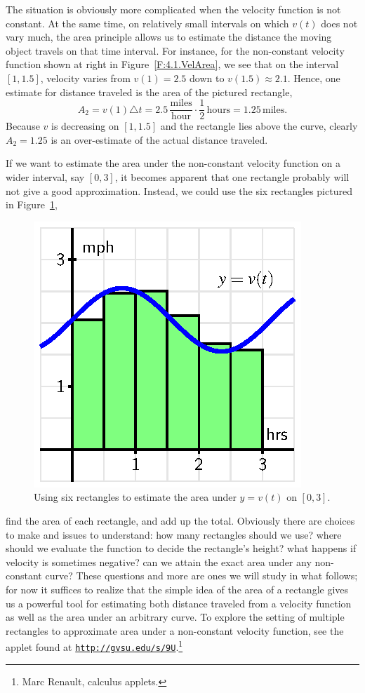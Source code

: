 The situation is obviously more complicated when the velocity function is not constant.  At the same time, on relatively small intervals on which $v(t)$ does not vary much, the area principle allows us to estimate the distance the moving object travels on that time interval.  For instance, for the non-constant velocity function shown at right in Figure~\ref{F:4.1.VelArea}, we see that on the interval $[1,1.5]$, velocity varies from $v(1) = 2.5$ down to $v(1.5) \approx 2.1$.  Hence, one estimate for distance traveled is the area of the pictured rectangle, 
$$A_2 = v(1) \triangle t = 2.5 \, \frac{\mbox{miles}}{\mbox{hour}} \cdot \frac{1}{2} \, \mbox{hours} = 1.25 \, \mbox{miles}.$$
Because $v$ is decreasing on $[1,1.5]$ and the rectangle lies above the curve, clearly $A_2 = 1.25$ is an over-estimate of the actual distance traveled.

If we want to estimate the area under the non-constant velocity function on a wider interval, say $[0,3]$, it becomes apparent that one rectangle probably will not give a good approximation.  Instead, we could use the six rectangles pictured in Figure~\ref{F:4.1.VelArea2},  
\begin{figure}[h]
\begin{center}
\includegraphics{figures/4_1_VelArea2.eps}
\caption{Using six rectangles to estimate the area under $y = v(t)$ on $[0,3]$.} \label{F:4.1.VelArea2}
\end{center}
\end{figure}
find the area of each rectangle, and add up the total.  Obviously there are choices to make and issues to understand: how many rectangles should we use?  where should we evaluate the function to decide the rectangle's height?  what happens if velocity is sometimes negative?  can we attain the exact area under any non-constant curve?  These questions and more are ones we will study in what follows; for now it suffices to realize that the simple idea of the area of a rectangle gives us a powerful tool for estimating both distance traveled from a velocity function as well as the area under an arbitrary curve.  To explore the setting of multiple rectangles to approximate area under a non-constant velocity function, see the applet found at \href{http://gvsu.edu/s/9U}{\texttt{http://gvsu.edu/s/9U}}.\footnote{Marc Renault, calculus applets.}

